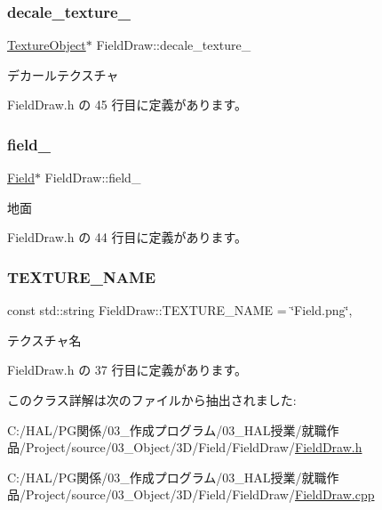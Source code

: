 \subsubsection{\texorpdfstring{decale\+\_\+texture\+\_\+}{decale\_texture\_}}
{\footnotesize\ttfamily \mbox{\hyperlink{class_texture_object}{Texture\+Object}}$\ast$ Field\+Draw\+::decale\+\_\+texture\+\_\+\hspace{0.3cm}{\ttfamily [private]}}



デカールテクスチャ 



 Field\+Draw.\+h の 45 行目に定義があります。

\mbox{\label{class_field_draw_a5d81171db83ea98a33c0e6f68b5dd351}} 
\subsubsection{\texorpdfstring{field\+\_\+}{field\_}}
{\footnotesize\ttfamily \mbox{\hyperlink{class_field}{Field}}$\ast$ Field\+Draw\+::field\+\_\+\hspace{0.3cm}{\ttfamily [private]}}



地面 



 Field\+Draw.\+h の 44 行目に定義があります。

\mbox{\label{class_field_draw_a0100eac615b34df95aaf3627182fb9f1}} 
\subsubsection{\texorpdfstring{T\+E\+X\+T\+U\+R\+E\+\_\+\+N\+A\+ME}{TEXTURE\_NAME}}
{\footnotesize\ttfamily const std\+::string Field\+Draw\+::\+T\+E\+X\+T\+U\+R\+E\+\_\+\+N\+A\+ME = \char`\"{}Field.\+png\char`\"{}\hspace{0.3cm}{\ttfamily [static]}, {\ttfamily [private]}}



テクスチャ名 



 Field\+Draw.\+h の 37 行目に定義があります。



このクラス詳解は次のファイルから抽出されました\+:\begin{DoxyCompactItemize}
\item 
C\+:/\+H\+A\+L/\+P\+G関係/03\+\_\+作成プログラム/03\+\_\+\+H\+A\+L授業/就職作品/\+Project/source/03\+\_\+\+Object/3\+D/\+Field/\+Field\+Draw/\mbox{\hyperlink{_field_draw_8h}{Field\+Draw.\+h}}\item 
C\+:/\+H\+A\+L/\+P\+G関係/03\+\_\+作成プログラム/03\+\_\+\+H\+A\+L授業/就職作品/\+Project/source/03\+\_\+\+Object/3\+D/\+Field/\+Field\+Draw/\mbox{\hyperlink{_field_draw_8cpp}{Field\+Draw.\+cpp}}\end{DoxyCompactItemize}

